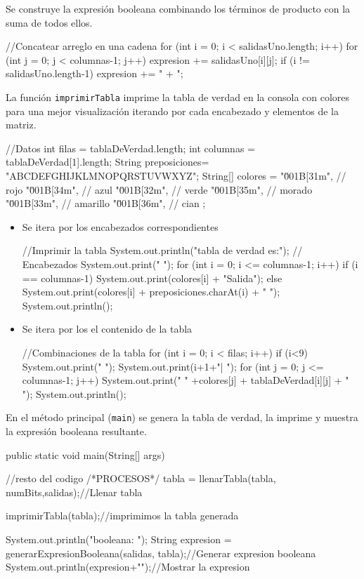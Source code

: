 Se construye la expresión booleana combinando los términos de producto con la suma de todos ellos.
\begin{javaCode}
//Concatear arreglo en una cadena
for (int i = 0; i < salidasUno.length; i++) {
    for (int j = 0; j < columnas-1; j++) {
        expresion += salidasUno[i][j];
    }
    if (i != salidasUno.length-1) {
        expresion += " + ";
    }
}
\end{javaCode}
La función \texttt{imprimirTabla} imprime la tabla de verdad en la consola con colores para una mejor visualización iterando por cada  encabezado y elementos de la matriz.
\begin{javaCode}
//Datos
    int filas = tablaDeVerdad.length;
    int columnas = tablaDeVerdad[1].length;
    String preposiciones= "ABCDEFGHIJKLMNOPQRSTUVWXYZ";
    String[] colores = {
        "\u001B[31m", // rojo
        "\u001B[34m", // azul
        "\u001B[32m", // verde
        "\u001B[35m", // morado
        "\u001B[33m", // amarillo
        "\u001B[36m", // cian
    };
\end{javaCode}
\newpage
\begin{itemize}
       \item[{\ieeeguilsinglright}] {\it } Se itera por los encabezados correspondientes
\begin{javaCode}    
    //Imprimir la tabla
    System.out.println("\nLa tabla de verdad es:");
    // Encabezados
    System.out.print("     ");
    for (int i = 0; i <= columnas-1; i++) {
        if (i == columnas-1) {
            System.out.print(colores[i] + "Salida");
        }else{
            System.out.print(colores[i] + preposiciones.charAt(i) + "  ");
        }
    }
    System.out.println();
\end{javaCode}
    \item[{\ieeeguilsinglright}] {\it } Se itera por los el contenido de la tabla
\begin{javaCode}
    //Combinaciones de la tabla
    for (int i = 0; i < filas; i++) {
        if (i<9) {
            System.out.print(" ");
        }
        System.out.print(i+1+"| ");
        for (int j = 0; j <= columnas-1; j++) {
            System.out.print(" " +colores[j] + tablaDeVerdad[i][j] + " ");
        }
        System.out.println();
    }
\end{javaCode}
\end{itemize}


En el método principal (\texttt{main}) se genera la tabla de verdad, la imprime y muestra la expresión booleana resultante.
\begin{javaCode}
public static void main(String[] args) {
    //resto del codigo
    /*PROCESOS*/
    tabla = llenarTabla(tabla, numBits,salidas);//Llenar tabla
    
    imprimirTabla(tabla);//imprimimos la tabla generada
    
    System.out.println("\nExpresion booleana: ");
    String expresion = generarExpresionBooleana(salidas, tabla);//Generar expresion booleana
    System.out.println(expresion+"\n");//Mostrar la expresion
}
\end{javaCode}

